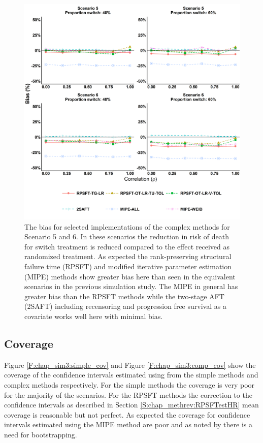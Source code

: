 \begin{figure}[ht]
\centering
\includegraphics[width=12cm]{images/chap_sim3/comp_bias56.png}
\caption{\label{F:chap_sim3:comp_bias56} The bias for selected implementations of the complex methods for Scenario 5 and 6. In these scenarios the reduction in risk of death for switch treatment is reduced compared to the effect received as randomized treatment. As expected the rank-preserving structural failure time (RPSFT) and modified iterative parameter estimation (MIPE) methods show greater bias here than seen in the equivalent scenarios in the previous simulation study. The MIPE in general has greater bias than the RPSFT methods while the two-stage AFT (2SAFT) including recensoring and progression free survival as a covariate works well here with minimal bias.} 
\end{figure}

\clearpage

\subsection{Coverage}

Figure \ref{F:chap_sim3:simple_cov} and Figure \ref{F:chap_sim3:comp_cov} show the coverage of the confidence intervals estimated using from the simple methods and complex methods respectively. For the simple methods the coverage is very poor for the majority of the scenarios. For the RPSFT methods the correction to the confidence intervals as described in Section \ref{S:chap_methrev:RPSFTestHR} mean coverage is reasonable but not perfect. As expected the coverage for confidence intervals estimated using the MIPE method are poor and as noted by \cite{Zhang2016} there is a need for bootstrapping.


